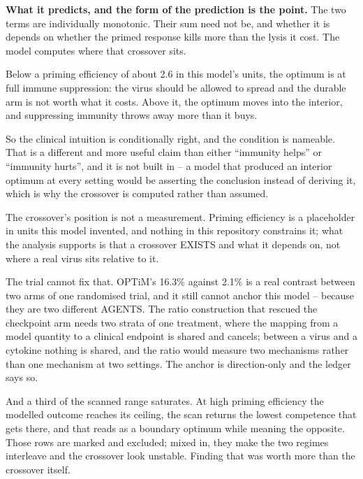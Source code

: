 \documentclass[11pt,twoside,openright]{report}
\begin{document}
\textbf{What it predicts, and the form of the prediction is the point.} The two terms are individually monotonic. Their sum need not be, and whether it is depends on whether the primed response kills more than the lysis it cost. The model computes where that crossover sits.

\begin{finding}
Below a priming efficiency of about 2.6 in this model's units, the optimum is at full immune suppression: the virus should be allowed to spread and the durable arm is not worth what it costs. Above it, the optimum moves into the interior, and suppressing immunity throws away more than it buys.

So the clinical intuition is conditionally right, and the condition is nameable. That is a different and more useful claim than either ``immunity helps'' or ``immunity hurts'', and it is not built in -- a model that produced an interior optimum at every setting would be asserting the conclusion instead of deriving it, which is why the crossover is computed rather than assumed.
\end{finding}

\begin{refusal}
The crossover's position is not a measurement. Priming efficiency is a placeholder in units this model invented, and nothing in this repository constrains it; what the analysis supports is that a crossover EXISTS and what it depends on, not where a real virus sits relative to it.

The trial cannot fix that. OPTiM's 16.3\% against 2.1\% is a real contrast between two arms of one randomised trial, and it still cannot anchor this model -- because they are two different AGENTS. The ratio construction that rescued the checkpoint arm needs two strata of one treatment, where the mapping from a model quantity to a clinical endpoint is shared and cancels; between a virus and a cytokine nothing is shared, and the ratio would measure two mechanisms rather than one mechanism at two settings. The anchor is direction-only and the ledger says so.

And a third of the scanned range saturates. At high priming efficiency the modelled outcome reaches its ceiling, the scan returns the lowest competence that gets there, and that reads as a boundary optimum while meaning the opposite. Those rows are marked and excluded; mixed in, they make the two regimes interleave and the crossover look unstable. Finding that was worth more than the crossover itself.
\end{refusal}
\end{document}
